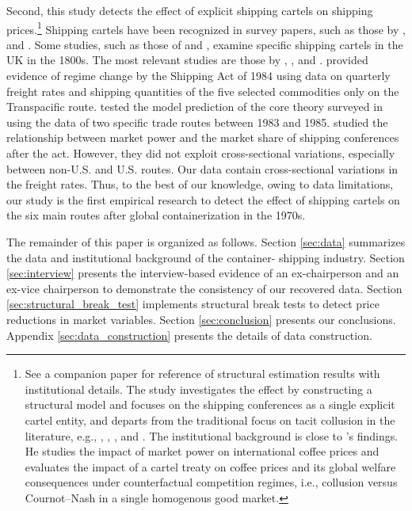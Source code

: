 \documentclass[11pt]{article}
\begin{document}
Second, this study detects the effect of explicit shipping cartels on shipping prices.\footnote{See a companion paper \citep{matsuda2022disentangling} for reference of structural estimation results with institutional details. The study investigates the effect by constructing a structural model and focuses on the shipping conferences as a single explicit cartel entity, and departs from the traditional focus on tacit collusion in the literature, e.g., \cite{porter1983study}, \cite{bresnahan1987competition}, \cite{miller2017understanding}, and \cite{byrne2019learning}.
The institutional background is close to \cite{igami2015market}'s findings. He studies the impact of market power on international coffee prices and evaluates the impact of a cartel treaty on coffee prices and its global welfare consequences under counterfactual competition regimes, i.e., collusion versus Cournot–Nash in a single homogenous good market.} Shipping cartels have been recognized in survey papers, such as those by  \cite{levenstein2006determines}, and \cite{asker2021}. Some studies, such as those of \cite{morton1997entry} and \cite{podolny1999social}, examine specific shipping cartels in the UK in the 1800s. The most relevant studies are those by  \cite{wilson1991some}, \cite{pirrong1992application}, and \cite{clyde1998market}. \cite{wilson1991some} provided evidence of regime change by the Shipping Act of 1984 using data on quarterly freight rates and shipping quantities of the five selected commodities only on the Transpacific route.  \cite{pirrong1992application} tested the model prediction of the core theory surveyed in \cite{sjostrom2013competition} using the data of two specific trade routes between 1983 and 1985. \cite{clyde1998market} studied the relationship between market power and the market share of shipping conferences after the act. However, they did not exploit cross-sectional variations, especially between non-U.S. and U.S. routes. Our data contain cross-sectional variations in the freight rates. Thus, to the best of our knowledge, owing to data limitations, our study is the first empirical research to detect the effect of shipping cartels on the six main routes after global containerization in the 1970s.

The remainder of this paper is organized as follows. Section \ref{sec:data} summarizes the data and institutional background of the container- shipping industry. Section \ref{sec:interview} presents the interview-based evidence of an ex-chairperson and an ex-vice chairperson to demonstrate the consistency of our recovered data. Section \ref{sec:structural_break_test} implements structural break tests to detect price reductions in market variables. Section \ref{sec:conclusion} presents our conclusions. Appendix \ref{sec:data_construction} presents the details of data construction.
\end{document}
